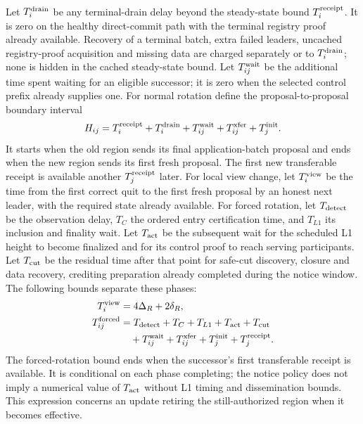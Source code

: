 \documentclass[11pt,a4paper,onecolumn]{article}
\begin{document}
Let $T_i^{\rm drain}$ be any terminal-drain delay beyond the steady-state bound $T_i^{\rm receipt}$.
It is zero on the healthy direct-commit path with the terminal registry
proof already available. Recovery of a terminal batch, extra failed leaders,
uncached registry-proof acquisition and missing data are charged separately
or to $T_i^{\rm drain}$; none is hidden in the cached steady-state bound.
Let $T_{ij}^{\rm wait}$ be the additional time spent waiting for an eligible
successor; it is zero when the selected control prefix already supplies one.
For normal rotation define the proposal-to-proposal boundary interval
\[
 H_{ij}=T_i^{\rm receipt}+T_i^{\rm drain}+T_{ij}^{\rm wait}+T_{ij}^{\rm xfer}+T_j^{\rm init}.
\]
It starts when the old region sends its final application-batch proposal
and ends when the new region sends its first fresh proposal. The first
new transferable receipt is available another $T_j^{\rm receipt}$ later.
For local view change, let $T_i^{\rm view}$ be the time from the first
correct quit to the first fresh proposal by an honest next leader, with
the required state already available. For forced rotation, let
$T_{\rm detect}$ be the observation delay, $T_C$ the ordered entry
certification time, and $T_{L1}$ its inclusion and finality wait.
Let $T_{\rm act}$ be the subsequent wait for the scheduled L1 height to
become finalized and for its control proof to reach serving participants.
Let $T_{\rm cut}$ be the residual time after that point for safe-cut
discovery, closure and data recovery, crediting preparation already
completed during the notice window. The following bounds separate these phases:
\[
 \begin{aligned}
 T_i^{\rm view}&=4\Delta_R+2\delta_R,\\
 T_{ij}^{\rm forced}&=T_{\rm detect}+T_C+T_{L1}+T_{\rm act}+T_{\rm cut}\\
                   &\quad+T_{ij}^{\rm wait}+T_{ij}^{\rm xfer}
                         +T_j^{\rm init}+T_j^{\rm receipt}.
 \end{aligned}
\]
The forced-rotation bound ends when the successor's first transferable
receipt is available. It is conditional on each phase completing; the
notice policy does not imply a numerical value of $T_{\rm act}$ without
L1 timing and dissemination bounds. This expression concerns an update
retiring the still-authorized region when it becomes effective.
\end{document}

